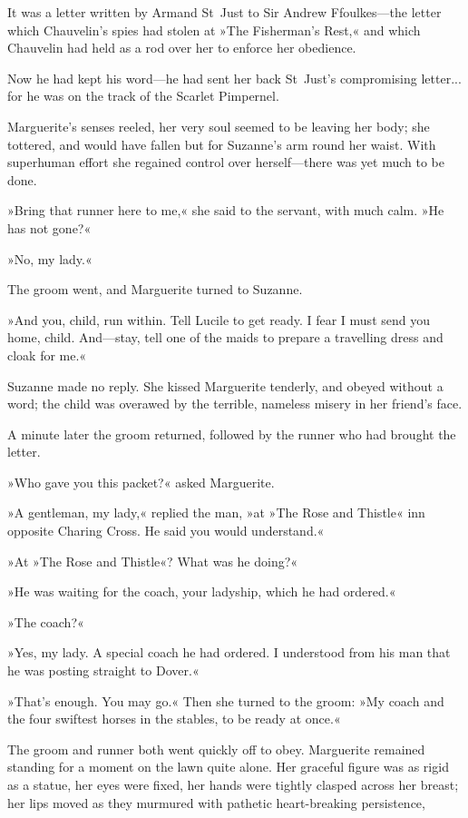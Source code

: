 It was a letter written by Armand St~Just to Sir Andrew Ffoulkes\allowbreak---\allowbreak the letter which Chauvelin's spies had stolen at »The Fisherman's Rest,« and which Chauvelin had held as a rod over her to enforce her obedience.

Now he had kept his word\allowbreak---\allowbreak he had sent her back St~Just's compromising letter... for he was on the track of the Scarlet Pimpernel.

Marguerite's senses reeled, her very soul seemed to be leaving her body; she tottered, and would have fallen but for Suzanne's arm round her waist. With superhuman effort she regained control over herself\allowbreak---\allowbreak there was yet much to be done.

»Bring that runner here to me,« she said to the servant, with much calm. »He has not gone?«

»No, my lady.«

The groom went, and Marguerite turned to Suzanne.

»And you, child, run within. Tell Lucile to get ready. I fear I must send you home, child. And\allowbreak---\allowbreak stay, tell one of the maids to prepare a travelling dress and cloak for me.«

Suzanne made no reply. She kissed Marguerite tenderly, and obeyed without a word; the child was overawed by the terrible, nameless misery in her friend's face.

A minute later the groom returned, followed by the runner who had brought the letter.

»Who gave you this packet?« asked Marguerite.

»A gentleman, my lady,« replied the man, »at »The Rose and Thistle« inn opposite Charing Cross. He said you would understand.«

»At »The Rose and Thistle«? What was he doing?«

»He was waiting for the coach, your ladyship, which he had ordered.«

»The coach?«

»Yes, my lady. A special coach he had ordered. I understood from his man that he was posting straight to Dover.«

»That's enough. You may go.« Then she turned to the groom: »My coach and the four swiftest horses in the stables, to be ready at once.«

The groom and runner both went quickly off to obey. Marguerite remained standing for a moment on the lawn quite alone. Her graceful figure was as rigid as a statue, her eyes were fixed, her hands were tightly clasped across her breast; her lips moved as they murmured with pathetic heart-breaking persistence,\longdash


